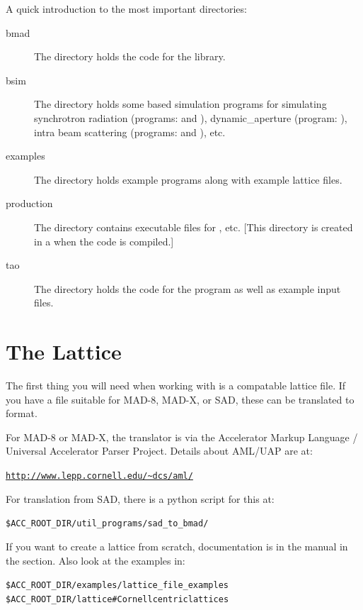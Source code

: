 \documentclass{hitec}
\begin{document}
A quick introduction to the most important directories:
  \begin{description}
  \item[bmad] \Newline
The  directory holds the code for the \bmad library.
  \item[bsim] \Newline
The  directory holds some \bmad based simulation programs for simulating
synchrotron radiation (programs:  and ), dynamic_aperture
(program: ), intra beam scattering (programs:  and
), etc.
  \item[examples] \Newline
The  directory holds example programs along with example lattice files.
  \item[production] \Newline
The  directory contains executable files for \tao, etc. [This
directory is created in a  when the \bmad code is compiled.]
  \item[tao] \Newline
The  directory holds the code for the \tao program as well as example input
files.
  \end{description}

\section{The Lattice}

The first thing you will need when working with \bmad is a \bmad compatable lattice file.
If you have a file suitable for MAD-8, MAD-X, or SAD, these can be translated to \bmad
format. 

For MAD-8 or MAD-X, the translator is via the Accelerator Markup Language /
Universal Accelerator Parser Project. Details about AML/UAP are at:
\begin{alltt}
  \url{http://www.lepp.cornell.edu/~dcs/aml/}
\end{alltt}

For translation from SAD, there is a python script for this at:
\begin{alltt}
   \$ACC_ROOT_DIR/util_programs/sad_to_bmad/
\end{alltt}

If you want to create a \bmad lattice from scratch, documentation is in the \bmad manual
in the  section. Also look at the examples in:
\begin{alltt}
  \$ACC_ROOT_DIR/examples/lattice_file_examples
  \$ACC_ROOT_DIR/lattice           # Cornell centric lattices
\end{alltt}
\end{document}
